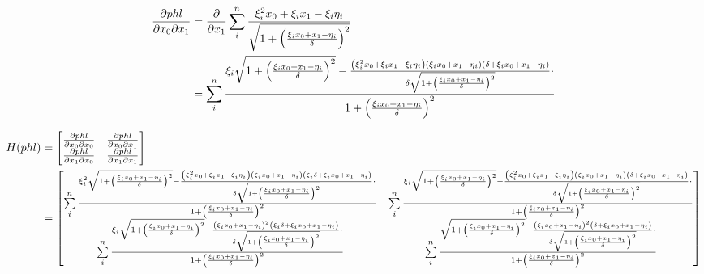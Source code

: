 \documentclass[paper=A3, 
   paper=landscape]{scrartcl}
\begin{document}
\begin{align*}
\frac{\partial phl}{\partial x_0 \partial x_1} &= \frac{\partial}{\partial x_1} \sum\limits_i^n \frac {\xi_i^2x_0 + \xi_ix_1 - \xi_i \eta_i}{\sqrt{1+ \left( \frac {\xi_i x_0 + x_1 -\eta_i}{\delta}\right)^2 }}\\
& = \sum\limits_i^n \frac {\xi_i  \sqrt{ 1+ \left( \frac {\xi_i x_0 + x_1 -\eta_i} {\delta} \right)^2 } - \frac{\left( \xi_i^2x_0 + \xi_ix_1 - \xi_i \eta_i \right)\left( \xi_i x_0 + x_1 -\eta_i \right) \left( \delta  + \xi_i x_0+x_1-\eta_i \right)}{\delta \sqrt{ 1+ \left( \frac {\xi_i x_0 + x_1 -\eta_i} {\delta} \right) ^2}} \cdot } {1+ \left( \frac {\xi_i x_0 + x_1 -\eta_i} {\delta} \right)^2}\\
\end{align*}


\begin{align}
H(phl) &= \begin{bmatrix}
\frac{\partial phl }{\partial x_0 \partial  x_0} & \frac{\partial phl }{\partial x_0 \partial x_1}\\
\frac{\partial phl }{\partial x_1 \partial  x_0} & \frac{\partial phl }{\partial x_1 \partial x_1}
\end{bmatrix}\\
&=\begin{bmatrix}
\sum\limits_i^n \frac {\xi_i^2 \sqrt{ 1+ \left( \frac {\xi_i x_0 + x_1 -\eta_i} {\delta} \right)^2 } - \frac{\left( \xi_i^2x_0 + \xi_ix_1 - \xi_i \eta_i \right)\left( \xi_i x_0 + x_1 -\eta_i \right) \left(\xi_i \delta  +  \xi_i x_0+x_1-\eta_i \right)}{\delta \sqrt{ 1+ \left( \frac {\xi_i x_0 + x_1 -\eta_i} {\delta} \right) ^2}} \cdot } {1+ \left( \frac {\xi_i x_0 + x_1 -\eta_i} {\delta} \right)^2} & \sum\limits_i^n \frac {\xi_i  \sqrt{ 1+ \left( \frac {\xi_i x_0 + x_1 -\eta_i} {\delta} \right)^2 } - \frac{\left( \xi_i^2x_0 + \xi_ix_1 - \xi_i \eta_i \right)\left( \xi_i x_0 + x_1 -\eta_i \right) \left( \delta  + \xi_i x_0+x_1-\eta_i \right)}{\delta \sqrt{ 1+ \left( \frac {\xi_i x_0 + x_1 -\eta_i} {\delta} \right) ^2}} \cdot } {1+ \left( \frac {\xi_i x_0 + x_1 -\eta_i} {\delta} \right)^2}\\
\sum\limits_i^n \frac {\xi_i \sqrt{ 1+ \left( \frac {\xi_i x_0 + x_1 -\eta_i} {\delta} \right)^2 } - \frac{\left( \xi_i x_0 + x_1 -\eta_i \right)^2 \left(\xi_i \delta  + \xi_i x_0+x_1-\eta_i\right)}{\delta \sqrt{ 1+ \left( \frac {\xi_i x_0 + x_1 -\eta_i} {\delta} \right) ^2}} \cdot } {1+ \left( \frac {\xi_i x_0 + x_1 -\eta_i} {\delta} \right)^2} & \sum\limits_i^n \frac {\sqrt{ 1+ \left( \frac {\xi_i x_0 + x_1 -\eta_i} {\delta} \right)^2 } - \frac{\left( \xi_i x_0 + x_1 -\eta_i \right)^2\left(\delta  + \xi_i x_0+x_1-\eta_i \right)}{\delta \sqrt{ 1+ \left( \frac {\xi_i x_0 + x_1 -\eta_i} {\delta} \right) ^2}} \cdot } {1+ \left( \frac {\xi_i x_0 + x_1 -\eta_i} {\delta} \right)^2}
\end{bmatrix}
\end{align}
\end{document}
